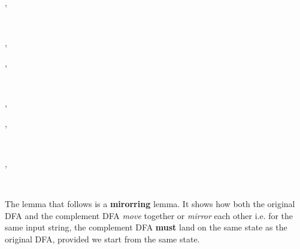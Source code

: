 \documentclass[a4paper]{article}
\begin{document}
\begin{alectryon}
  \sep
  \begin{sentence}
    \begin{input}
      ~\nl
    \end{input}
  \end{sentence}
  \sep
  \begin{txt}
    \nl
  \end{txt}
  \sep
  \begin{sentence}
    \begin{input}
      ~~~~~~~~~~~~~~\nl
      ~~~~~~\nl
      ~~~~~~\nl
      ~~~~~~\nl
      ~~~~~~~~~~~\nl
      ~~~~~~\nl
      ~~\nl
    \end{input}
  \end{sentence}
  \sep
  \begin{txt}
    \nl
  \end{txt}
  \sep
  \begin{sentence}
    \begin{input}
      ~~~~~~\nl
    \end{input}
  \end{sentence}
  \sep
  \begin{sentence}
    \begin{input}
      ~~~~~~~
    \end{input}
  \end{sentence}
\end{alectryon}

The lemma that follows is a \textbf{mirorring} lemma. It shows how both the original 
DFA and the complement DFA \emph{move} together or \emph{mirror} each other i.e. for the 
same input string, the complement DFA \textbf{must} land on the same state as the 
original DFA, provided we start from the same state.
\end{document}
